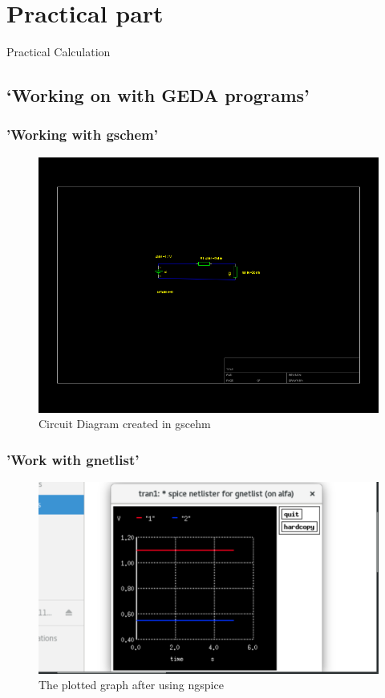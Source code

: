 \documentclass{report}
\begin{document}
 \begin{center}
\end{center}

\chapter{Practical part}
Practical Calculation
\section{‘Working on with GEDA programs'}
\subsection{'Working with gschem'}
\begin{figure}[hbt!]
 \centering
 \caption{Circuit Diagram created in gscehm}
\includegraphics[width=\textwidth]{01.png}
 \end{figure}
\subsection{'Work with gnetlist'}

\begin{figure}[hbt!]
 \centering
  \caption{The plotted graph after using ngspice}
\includegraphics[width=\textwidth]{03.png}
 \end{figure}
 

\begin{center}
\end{center}
\end{document}

